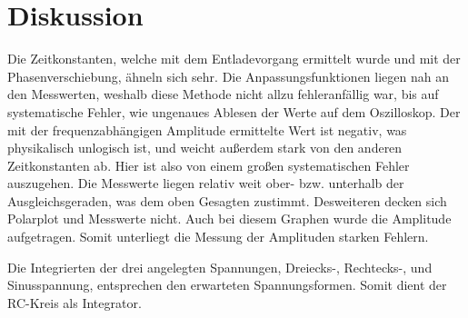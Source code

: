 \section{Diskussion}
\label{sec:Diskussion}


Die Zeitkonstanten, welche mit dem Entladevorgang ermittelt wurde und mit der Phasenverschiebung, ähneln sich sehr. 
Die Anpassungsfunktionen liegen nah an den Messwerten, weshalb diese Methode nicht allzu fehleranfällig war, bis auf systematische Fehler,
wie ungenaues Ablesen der Werte auf dem Oszilloskop. Der mit der frequenzabhängigen Amplitude ermittelte Wert ist negativ, was physikalisch unlogisch ist,
und weicht außerdem stark von den anderen Zeitkonstanten ab. Hier ist also von einem großen systematischen Fehler auszugehen.
Die Messwerte liegen relativ weit ober- bzw. unterhalb der Ausgleichsgeraden, was dem oben Gesagten zustimmt. 
Desweiteren decken sich Polarplot und Messwerte nicht. Auch bei diesem Graphen wurde die Amplitude aufgetragen. Somit unterliegt 
die Messung der Amplituden starken Fehlern.

\noindent Die Integrierten der drei angelegten Spannungen, Dreiecks-, Rechtecks-, und Sinusspannung, entsprechen den erwarteten Spannungsformen.
Somit dient der RC-Kreis als Integrator.